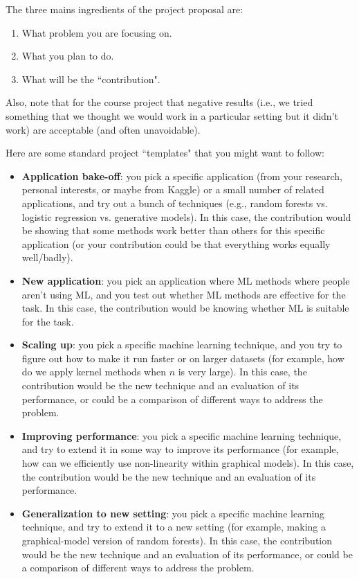 \documentclass{article}
\def\blu#1{{\color{blu}#1}}
\def\items#1{\begin{itemize}#1\end{itemize}}
\begin{document}
\blu{The three mains ingredients of the project proposal are:
\begin{enumerate}
\item What problem you are focusing on.
\item What you plan to do.
\item What will be the ``contribution".
\end{enumerate}
}
Also, note that for the course project that negative results (i.e., we tried something that we thought we would work in a particular setting but it didn't work) are acceptable (and often unavoidable).

Here are some standard project ``templates" that you might want to follow:

\items{
\item \textbf{Application bake-off}: you pick a specific application (from your research, personal interests, or maybe from Kaggle) or a small number of related applications, and try out a bunch of techniques (e.g., random forests vs. logistic regression vs. generative models). In this case, the contribution would be showing that some methods work better than others for this specific application (or your contribution could be that everything works equally well/badly).
\item \textbf{New application}: you pick an application where ML methods where people aren't using ML, and you test out whether ML methods are effective for the task. In this case, the contribution would be knowing whether ML is suitable for the task.
\item \textbf{Scaling up}: you pick a specific machine learning technique, and you try to figure out how to make it run faster or on larger datasets (for example, how do we apply kernel methods when $n$ is very large). In this case, the contribution would be the new technique and an evaluation of its performance, or could be a comparison of different ways to address the problem.
\item \textbf{Improving performance}: you pick a specific machine learning technique, and try to extend it in some way to improve its performance (for example, how can we efficiently use non-linearity within graphical models). In this case, the contribution would be the new technique and an evaluation of its performance.
\item \textbf{Generalization to new setting}: you pick a specific machine learning technique, and try to extend it to a new setting (for example, making a graphical-model version of random forests).  In this case, the contribution would be the new technique and an evaluation of its performance, or could be a comparison of different ways to address the problem.
}
\end{document}
